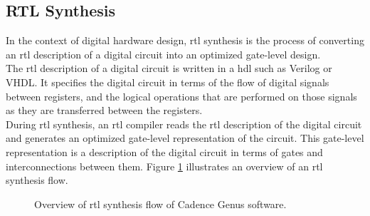\documentclass[a4paper,11pt]{article}%
\begin{document}
\pagebreak
\subsection{RTL Synthesis}

In the context of digital hardware design, \ac{rtl} synthesis is the process of converting an \ac{rtl} description of a digital circuit into an optimized gate-level design.\\

The \ac{rtl} description of a digital circuit is written in a \ac{hdl} such as Verilog or VHDL. It specifies the digital circuit in terms of the flow of digital signals between registers, and the logical operations that are performed on those signals as they are transferred between the registers.\\

During \ac{rtl} synthesis, an \ac{rtl} compiler reads the \ac{rtl} description of the digital circuit and generates an optimized gate-level representation of the circuit. This gate-level representation is a description of the digital circuit in terms of gates and interconnections between them. Figure \ref{fig:asic_flow} illustrates an overview of an \ac{rtl} synthesis flow.

\vfill

\begin{figure}[h]
	\centering
	\caption{Overview of \ac{rtl} synthesis flow of Cadence Genus software\cite{genus_user_guide_2019}.}
	\label{fig:asic_flow}
\end{figure}
\end{document}
